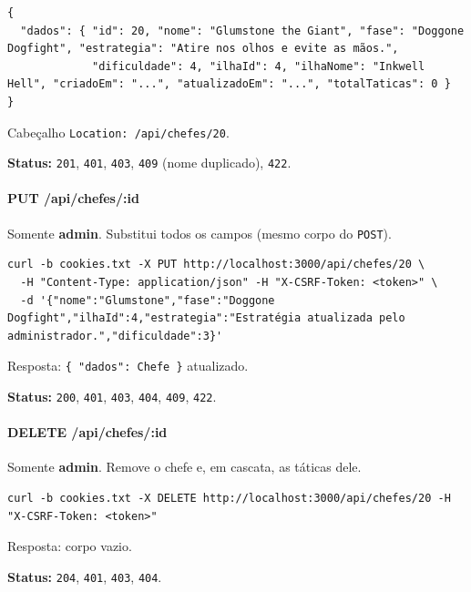 \begin{Verbatim}[breaklines,breakanywhere,fontsize=\scriptsize]
{
  "dados": { "id": 20, "nome": "Glumstone the Giant", "fase": "Doggone Dogfight", "estrategia": "Atire nos olhos e evite as mãos.",
             "dificuldade": 4, "ilhaId": 4, "ilhaNome": "Inkwell Hell", "criadoEm": "...", "atualizadoEm": "...", "totalTaticas": 0 }
}
\end{Verbatim}

Cabeçalho \texttt{Location:\ /api/chefes/20}.

\textbf{Status:} \texttt{201}, \texttt{401}, \texttt{403}, \texttt{409}
(nome duplicado), \texttt{422}.

\hypertarget{put-apichefesid}{%
\paragraph{PUT /api/chefes/:id}\label{put-apichefesid}}

Somente \textbf{admin}. Substitui todos os campos (mesmo corpo do
\texttt{POST}).

\begin{Verbatim}[breaklines,breakanywhere,fontsize=\scriptsize]
curl -b cookies.txt -X PUT http://localhost:3000/api/chefes/20 \
  -H "Content-Type: application/json" -H "X-CSRF-Token: <token>" \
  -d '{"nome":"Glumstone","fase":"Doggone Dogfight","ilhaId":4,"estrategia":"Estratégia atualizada pelo administrador.","dificuldade":3}'
\end{Verbatim}

Resposta: \texttt{\{\ "dados":\ Chefe\ \}} atualizado.

\textbf{Status:} \texttt{200}, \texttt{401}, \texttt{403}, \texttt{404},
\texttt{409}, \texttt{422}.

\hypertarget{delete-apichefesid}{%
\paragraph{DELETE /api/chefes/:id}\label{delete-apichefesid}}

Somente \textbf{admin}. Remove o chefe e, em cascata, as táticas dele.

\begin{Verbatim}[breaklines,breakanywhere,fontsize=\scriptsize]
curl -b cookies.txt -X DELETE http://localhost:3000/api/chefes/20 -H "X-CSRF-Token: <token>"
\end{Verbatim}

Resposta: corpo vazio.

\textbf{Status:} \texttt{204}, \texttt{401}, \texttt{403}, \texttt{404}.

